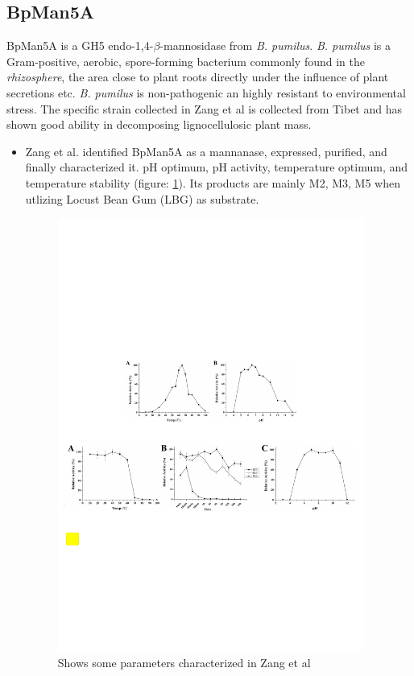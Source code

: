 \documentclass{article}
\begin{document}
\subsection{BpMan5A}
BpMan5A is a GH5 endo-1,4-$\beta$-mannosidase from \textit{B. pumilus}. \textit{B. pumilus} is a Gram-positive, aerobic, spore-forming bacterium commonly found in the \textit{rhizosphere}, the area close to plant roots directly under the influence of plant secretions etc. \textit{B. pumilus} is non-pathogenic an highly resistant to environmental stress. The specific strain collected in Zang et al \cite{Zang2015} is collected from Tibet and has shown good ability in decomposing lignocellulosic plant mass.

\begin{itemize}
  \item Zang et al. \cite{Zang2015} identified BpMan5A as a mannanase, expressed, purified, and finally characterized it. pH optimum, pH activity, temperature optimum, and temperature stability (figure: \ref{fig:zang}). Its products are mainly M2, M3, M5 when utlizing Locust Bean Gum (LBG) as substrate.

 \begin{figure}[!h]
	\centering
	\includegraphics[width=0.95\textwidth]{figures/Zang.pdf}
	\caption{Shows some parameters characterized in Zang et al \cite{Zang2015}}
	\label{fig:zang}
\end{figure}
\end{itemize} %
\end{document}
